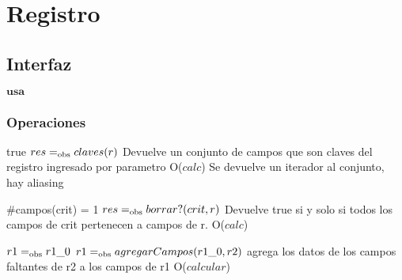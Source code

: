 



\section{Registro}

\subsection{Interfaz}

$\textbf{usa}$  




\subsubsection*{Operaciones}





 {true}
 {$res =_{\mathrm{obs}} claves(r)$}
 {Devuelve un conjunto de campos que son claves del registro ingresado por parametro}
 {O($calc$)} %
 {Se devuelve un iterador al conjunto, hay aliasing}

 {$\#$campos(crit) = 1}
 {$res =_{\mathrm{obs}} borrar?(crit, r)$}
 {Devuelve true si y solo si todos los campos de crit pertenecen a campos de r.}
 {O($calc$)} %
 {}

 {$ r1 =_{\mathrm{obs}} r1\_0 $}
 {$r1 =_{\mathrm{obs}} agregarCampos(r1\_0, r2) $}
 {agrega los datos de los campos faltantes de r2 a los campos de r1}
 {O($calcular$) }
 {}
 
